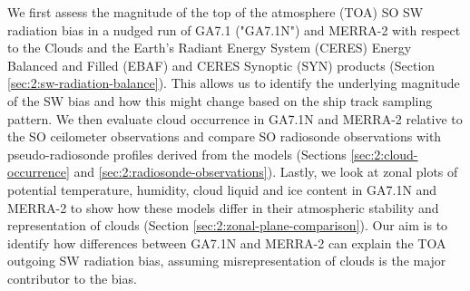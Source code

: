 We first assess the magnitude of the top of the atmosphere (TOA) SO SW radiation
bias in a nudged run of GA7.1 ("GA7.1N") and MERRA-2 with respect to the Clouds
and the Earth's Radiant Energy System (CERES) Energy Balanced and Filled (EBAF)
and CERES Synoptic (SYN) products (Section \ref{sec:2:sw-radiation-balance}). This
allows us to identify the underlying magnitude of the SW bias and how this might
change based on the ship track sampling pattern. We then evaluate cloud
occurrence in GA7.1N and MERRA-2 relative to the SO ceilometer observations and
compare SO radiosonde observations with pseudo-radiosonde profiles derived from
the models (Sections \ref{sec:2:cloud-occurrence} and
\ref{sec:2:radiosonde-observations}). Lastly, we look at zonal plots of potential
temperature, humidity, cloud liquid and ice content in GA7.1N and MERRA-2 to
show how these models differ in their atmospheric stability and representation
of clouds (Section \ref{sec:2:zonal-plane-comparison}). Our aim is to identify how
differences between GA7.1N and MERRA-2 can explain the TOA outgoing SW
radiation bias, assuming misrepresentation of clouds is the major contributor
to the bias.

\begin{table}[t]
\caption[Table of voyages]{
Table of voyages. The table lists voyages analysed in this study. Listed is  the
voyage name (Voyage), which is the official name of the voyage or an
abbreviation for the purpose of this study, ship name (Ship), organisation
(Org.), start and end dates of the voyage (Start, End), number of days spent at
sea (Days), target region of the SO (Region), maximum and minimum geographical
coordinates of the voyage track (Lat., Lon.). }
\label{tab:2:voyages}
\centering
{}
\end{table}

